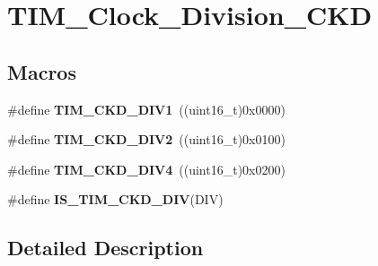 \hypertarget{group___t_i_m___clock___division___c_k_d}{\section{T\-I\-M\-\_\-\-Clock\-\_\-\-Division\-\_\-\-C\-K\-D}
\label{group___t_i_m___clock___division___c_k_d}
}
\subsection*{Macros}
\begin{DoxyCompactItemize}
\item 
\hypertarget{group___t_i_m___clock___division___c_k_d_ga88691a07b3976791977d280045b3c850}{\#define {\bfseries T\-I\-M\-\_\-\-C\-K\-D\-\_\-\-D\-I\-V1}~((uint16\-\_\-t)0x0000)}\label{group___t_i_m___clock___division___c_k_d_ga88691a07b3976791977d280045b3c850}

\item 
\hypertarget{group___t_i_m___clock___division___c_k_d_ga46a5fd6a173a7e88528a6e4084a08665}{\#define {\bfseries T\-I\-M\-\_\-\-C\-K\-D\-\_\-\-D\-I\-V2}~((uint16\-\_\-t)0x0100)}\label{group___t_i_m___clock___division___c_k_d_ga46a5fd6a173a7e88528a6e4084a08665}

\item 
\hypertarget{group___t_i_m___clock___division___c_k_d_gac2e5c030f964f9b4c92fa8129fb923bc}{\#define {\bfseries T\-I\-M\-\_\-\-C\-K\-D\-\_\-\-D\-I\-V4}~((uint16\-\_\-t)0x0200)}\label{group___t_i_m___clock___division___c_k_d_gac2e5c030f964f9b4c92fa8129fb923bc}

\item 
\#define {\bfseries I\-S\-\_\-\-T\-I\-M\-\_\-\-C\-K\-D\-\_\-\-D\-I\-V}(D\-I\-V)
\end{DoxyCompactItemize}


\subsection{Detailed Description}


